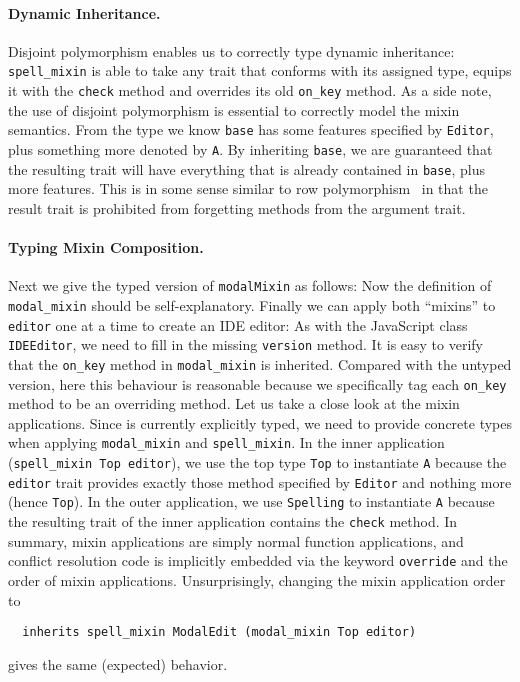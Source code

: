 \paragraph{Dynamic Inheritance.}

Disjoint polymorphism enables us to correctly type dynamic inheritance:
\lstinline{spell_mixin} is able to take any trait that conforms with its
assigned type, equips it with the \lstinline{check} method and overrides its
old \lstinline{on_key} method. As a side note, the use of disjoint polymorphism
is essential to correctly model the mixin semantics. From the type we know
\lstinline{base} has some features specified by \lstinline{Editor}, plus
something more denoted by \lstinline{A}. By inheriting \lstinline{base}, we are
guaranteed that the resulting trait will have everything that is already contained
in \lstinline{base}, plus more features. This is in some sense similar to row
polymorphism~\citep{wand1994type} in that the result trait is prohibited from
forgetting methods from the argument trait.


\paragraph{Typing Mixin Composition.}
Next we give the typed version of \lstinline{modalMixin} as follows:
Now the definition of \lstinline{modal_mixin} should be self-explanatory.
Finally we can apply both ``mixins'' to \lstinline{editor} one at a time to create
an IDE editor:
As with the JavaScript class \lstinline{IDEEditor}, we need to fill in the missing
\lstinline{version} method. It is easy to verify that the \lstinline{on_key} method
in \lstinline{modal_mixin} is inherited. Compared with the untyped version,
here this behaviour is reasonable because we specifically tag each
\lstinline{on_key} method to be an overriding method. Let us take a close look
at the mixin applications. Since \sedel is currently explicitly typed, we need to
provide concrete types when applying \lstinline{modal_mixin} and \lstinline{spell_mixin}.
In the inner application (\lstinline{spell_mixin Top editor}), we use the top
type \lstinline{Top} to instantiate \lstinline{A} because the \lstinline{editor} trait
provides exactly those method specified by \lstinline{Editor} and nothing more
(hence \lstinline{Top}). In the outer application, we use \lstinline{Spelling}
to instantiate \lstinline{A} because the resulting trait of the inner application
contains the \lstinline{check} method.
In summary, mixin applications are simply normal function applications,
and conflict resolution code is implicitly embedded via the keyword \lstinline{override}
and the order of mixin applications.
Unsurprisingly, changing the mixin application order to
\begin{lstlisting}
  inherits spell_mixin ModalEdit (modal_mixin Top editor)
\end{lstlisting}
gives the same (expected) behavior.


